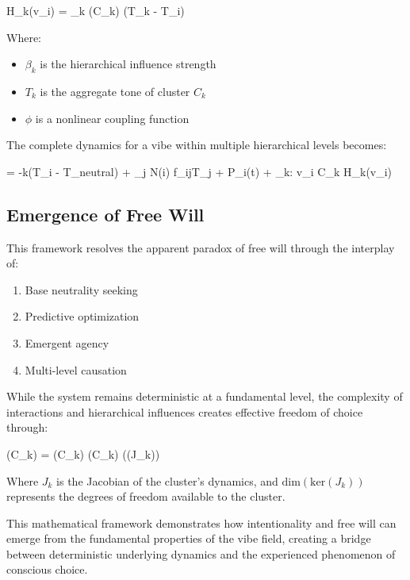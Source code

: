 \documentclass{article}
\let\oldequation\equation
\let\endoldequation\endequation
\renewenvironment{equation}{%
    \noindent\vspace{-\parskip}\vspace{-\baselineskip}%
    \oldequation
}{%
    \endoldequation
    \noindent\vspace{-\parskip}\vspace{-\baselineskip}%
}
\theoremstyle{definition}
\theoremstyle{axiom}
\theoremstyle{theorem}
\theoremstyle{lemma}
\theoremstyle{proposition}
\begin{document}
\begin{equation}
H_k(v_i) = \beta_k \cdot {}(C_k) \cdot \phi(T_k - T_i)
\end{equation}

Where:
\begin{itemize}
\item $\beta_k$ is the hierarchical influence strength
\item $T_k$ is the aggregate tone of cluster $C_k$
\item $\phi$ is a nonlinear coupling function
\end{itemize}

The complete dynamics for a vibe within multiple hierarchical levels becomes:

\begin{equation}
 = -k(T_i - T_{neutral}) + \sum_{j \in N(i)} f_{ij}T_j + P_i(t) + \sum_{k: v_i \in C_k} H_k(v_i)
\end{equation}

\subsection{Emergence of Free Will}

This framework resolves the apparent paradox of free will through the interplay of:

\begin{enumerate}
\item Base neutrality seeking
\item Predictive optimization
\item Emergent agency
\item Multi-level causation
\end{enumerate}

While the system remains deterministic at a fundamental level, the complexity of interactions and hierarchical influences creates effective freedom of choice through:

\begin{equation}
(C_k) = (C_k) \cdot {}(C_k) \cdot {}((J_k))
\end{equation}

Where $J_k$ is the Jacobian of the cluster's dynamics, and $\text{dim}(\text{ker}(J_k))$ represents the degrees of freedom available to the cluster.

This mathematical framework demonstrates how intentionality and free will can emerge from the fundamental properties of the vibe field, creating a bridge between deterministic underlying dynamics and the experienced phenomenon of conscious choice.
\end{document}
